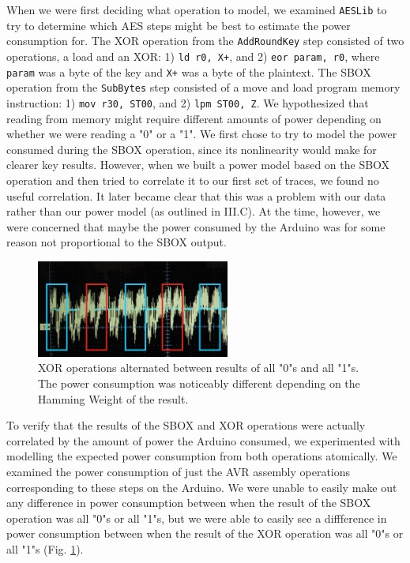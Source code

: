 \documentclass[journal]{ieee_style}
\begin{document}
When we were first deciding what operation to model, we examined \texttt{AESLib} to try to determine which AES steps might be best to estimate the power consumption for. The XOR operation from the \texttt{AddRoundKey} step consisted of two operations, a load and an XOR: 1) \texttt{ld r0, X+}, and 2) \texttt{eor param, r0}, where \texttt{param} was a byte of the key and \texttt{X+} was a byte of the plaintext. The SBOX operation from the \texttt{SubBytes} step consisted of a move and load program memory instruction: 1) \texttt{mov r30, ST00}, and 2) \texttt{lpm ST00, Z}. We hypothesized that reading from memory might require different amounts of power depending on whether we were reading a "0" or a "1". We first chose to try to model the power consumed during the SBOX operation, since its nonlinearity would make for clearer key results. However, when we built a power model based on the SBOX operation and then tried to correlate it to our first set of traces, we found no useful correlation. It later became clear that this was a problem with our data rather than our power model (as outlined in III.C). At the time, however, we were concerned that maybe the power consumed by the Arduino was for some reason not proportional to the SBOX output. 

\begin{figure}[!t]
\centering
\includegraphics[width=2.5in]{XOR_PC}
\caption{XOR operations alternated between results of all "0"s and all "1"s. The power consumption was noticeably different depending on the Hamming Weight of the result.}
\label{fig_xor}
\end{figure}

To verify that the results of the SBOX and XOR operations were actually correlated by the amount of power the Arduino consumed, we experimented with modelling the expected power consumption from both operations atomically. We examined the power consumption of just the AVR assembly operations corresponding to these steps on the Arduino. We were unable to easily make out any difference in power consumption between when the result of the SBOX operation was all "0"s or all "1"s, but we were able to easily see a diffference in power consumption between when the result of the XOR operation was all "0"s or all "1"s (Fig. \ref{fig_xor}).
\end{document}
